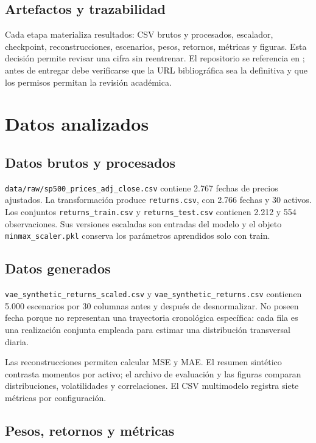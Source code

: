 \subsection{Artefactos y trazabilidad}

Cada etapa materializa resultados: CSV brutos y procesados, escalador, checkpoint, reconstrucciones, escenarios, pesos, retornos, métricas y figuras. Esta decisión permite revisar una cifra sin reentrenar. El repositorio se referencia en \cite{machin2026repositorio}; antes de entregar debe verificarse que la URL bibliográfica sea la definitiva y que los permisos permitan la revisión académica.

\section{Datos analizados}

\subsection{Datos brutos y procesados}

\texttt{data/raw/sp500\_prices\_adj\_close.csv} contiene 2.767 fechas de precios ajustados. La transformación produce \texttt{returns.csv}, con 2.766 fechas y 30 activos. Los conjuntos \texttt{returns\_train.csv} y \texttt{returns\_test.csv} contienen 2.212 y 554 observaciones. Sus versiones escaladas son entradas del modelo y el objeto \texttt{minmax\_scaler.pkl} conserva los parámetros aprendidos solo con train.

\subsection{Datos generados}

\texttt{vae\_synthetic\_returns\_scaled.csv} y \texttt{vae\_synthetic\_returns.csv} contienen 5.000 escenarios por 30 columnas antes y después de desnormalizar. No poseen fecha porque no representan una trayectoria cronológica específica: cada fila es una realización conjunta empleada para estimar una distribución transversal diaria.

Las reconstrucciones permiten calcular MSE y MAE. El resumen sintético contrasta momentos por activo; el archivo de evaluación y las figuras comparan distribuciones, volatilidades y correlaciones. El CSV multimodelo registra siete métricas por configuración.

\subsection{Pesos, retornos y métricas}

